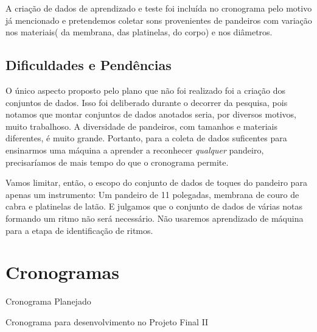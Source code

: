 \documentclass[
  dissertacao,
  brazil
]{ThesisPUC}
\begin{document}
A criação de dados de aprendizado e teste foi incluída no cronograma pelo motivo já mencionado e pretendemos coletar sons provenientes de pandeiros com variação nos materiais( da membrana, das platinelas, do corpo) e nos diâmetros.


\section{Dificuldades e Pendências}

O único aspecto proposto pelo plano que não foi realizado foi a criação dos conjuntos de dados.
Isso foi deliberado durante o decorrer da pesquisa, pois notamos que montar conjuntos de dados anotados seria, por diversos motivos, muito trabalhoso.
A diversidade de pandeiros, com tamanhos e materiais diferentes, é muito grande. 
Portanto, para a coleta de dados suficentes para ensinarmos uma máquina a aprender a reconhecer \emph{qualquer} pandeiro, precisaríamos de mais tempo do que o cronograma permite. 

Vamos limitar, então, o escopo do conjunto de dados de toques do pandeiro para apenas um instrumento: Um pandeiro de 11 polegadas, membrana de couro de cabra e platinelas de latão.
E julgamos que o conjunto de dados de várias notas formando um ritmo não será necessário. Não usaremos aprendizado de máquina para a etapa de identificação de ritmos.


\chapter{Cronogramas}

\caption{Cronograma Planejado}

\caption{Cronograma para desenvolvimento no Projeto Final II}

\arial

\normalfont
\end{document}
